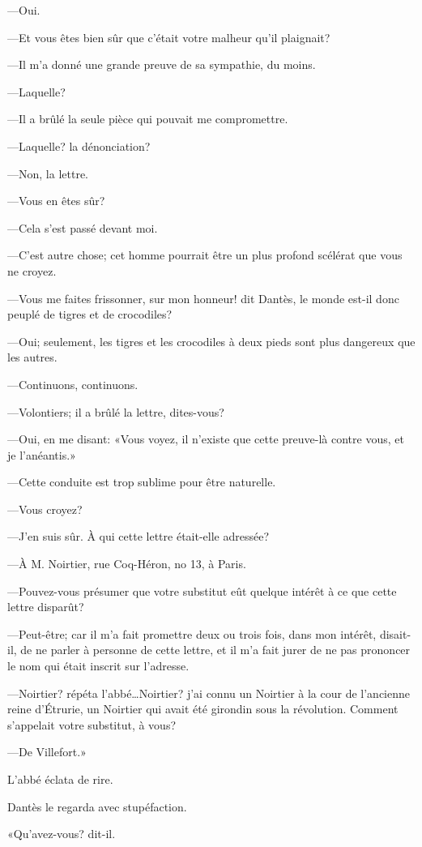 —Oui.

—Et vous êtes bien sûr que c'était votre malheur qu'il plaignait?

—Il m'a donné une grande preuve de sa sympathie, du moins.

—Laquelle?

—Il a brûlé la seule pièce qui pouvait me compromettre.

—Laquelle? la dénonciation?

—Non, la lettre.

—Vous en êtes sûr?

—Cela s'est passé devant moi.

—C'est autre chose; cet homme pourrait être un plus profond scélérat que vous ne croyez.

—Vous me faites frissonner, sur mon honneur! dit Dantès, le monde est-il donc peuplé de tigres et de crocodiles?

—Oui; seulement, les tigres et les crocodiles à deux pieds sont plus dangereux que les autres.

—Continuons, continuons.

—Volontiers; il a brûlé la lettre, dites-vous?

—Oui, en me disant: «Vous voyez, il n'existe que cette preuve-là contre vous, et je l'anéantis.»

—Cette conduite est trop sublime pour être naturelle.

—Vous croyez?

—J'en suis sûr. À qui cette lettre était-elle adressée?

—À M. Noirtier, rue Coq-Héron, no 13, à Paris.

—Pouvez-vous présumer que votre substitut eût quelque intérêt à ce que cette lettre disparût?

—Peut-être; car il m'a fait promettre deux ou trois fois, dans mon intérêt, disait-il, de ne parler à personne de cette lettre, et il m'a fait jurer de ne pas prononcer le nom qui était inscrit sur l'adresse.

—Noirtier? répéta l'abbé\dots Noirtier? j'ai connu un Noirtier à la cour de l'ancienne reine d'Étrurie, un Noirtier qui avait été girondin sous la révolution. Comment s'appelait votre substitut, à vous?

—De Villefort.»

L'abbé éclata de rire.

Dantès le regarda avec stupéfaction.

«Qu'avez-vous? dit-il.

